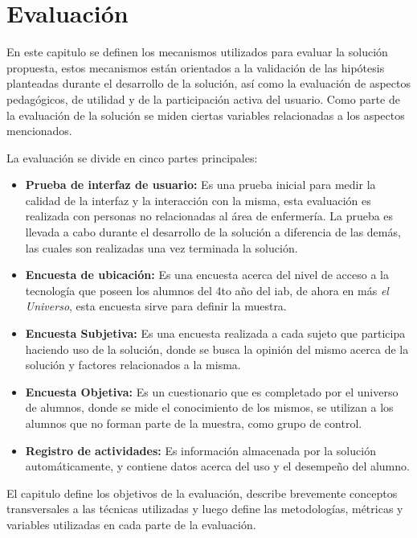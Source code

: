 
\chapter{Evaluación}
\label{chap:evaluacion}

En este capitulo se definen los mecanismos utilizados para evaluar la solución
propuesta, estos mecanismos están orientados a la validación de las hipótesis
planteadas durante el desarrollo de la solución, así como la evaluación de aspectos
pedagógicos, de utilidad y de la participación activa del usuario. 
Como parte de la evaluación de la solución se miden ciertas variables relacionadas 
a los aspectos mencionados.

La evaluación se divide en cinco partes principales:

\begin{itemize}
    \item \textbf{Prueba de interfaz de usuario:} Es una prueba inicial para medir 
        la calidad de la interfaz y la interacción con la misma, esta evaluación es realizada 
        con personas no relacionadas al área de enfermería. La prueba es llevada a cabo durante 
        el desarrollo de la solución a diferencia de las demás, las cuales son realizadas 
        una vez terminada la solución.

    \item \textbf{Encuesta de ubicación:} Es una encuesta acerca del nivel de
        acceso a la tecnología que poseen los alumnos del 4to año del \Gls{iab},
        de ahora en más \textit{el Universo}, esta encuesta sirve para definir
        la muestra.

    \item \textbf{Encuesta Subjetiva:} Es una encuesta realizada a cada sujeto
        que participa haciendo uso de la solución, donde se busca la opinión del mismo 
        acerca de la solución y factores relacionados a la misma. 

    \item \textbf{Encuesta Objetiva:} Es un cuestionario que es completado por
        el universo de alumnos, donde se mide el conocimiento de los mismos, se
        utilizan a los alumnos que no forman parte de la muestra, como grupo de
        control.

    \item \textbf{Registro de actividades:} Es información almacenada por la solución 
        automáticamente, y contiene datos acerca del uso y el desempeño del alumno.
        
\end{itemize}

El capitulo define los objetivos de la evaluación, describe brevemente conceptos
transversales a las técnicas utilizadas y luego define las metodologías,
métricas y variables utilizadas en cada parte de la evaluación.









